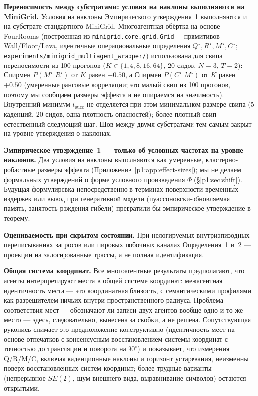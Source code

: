 \documentclass{article}
\begin{document}
\textbf{Переносимость между субстратами: условия на наклоны выполняются на MiniGrid.} Условия на наклоны Эмпирического утверждения~1 выполняются и на субстрате стандартного MiniGrid. Многоагентная обёртка на основе FourRooms (построенная из \texttt{minigrid.core.grid.Grid} + примитивов Wall/Floor/Lava, идентичные операциональные определения $Q^\star,R^\star,M^\star,C^\star$; \texttt{experiments/minigrid\_multiagent\_wrapper/}) использована для свипа переносимости из 100 прогонов ($K{\in}\{1,4,8,16,64\}$, 20 сидов, $N{=}3$, $T{=}2$): Спирмен $P(M^\star|R^\star)$ от $K$ равен $-0.50$, а Спирмен $P(C^\star|M^\star)$ от $K$ равен $+0.50$ (умеренные ранговые корреляции; это малый свип из 100 прогонов, поэтому мы сообщаем размеры эффекта и не опираемся на значимость). Внутренний минимум $t_{\mathrm{succ}}$ не отделяется при этом минимальном размере свипа (5 каденций, 20 сидов, одна плотность опасностей); более плотный свип --- естественный следующий шаг. Шов между двумя субстратами тем самым закрыт на уровне утверждения о наклонах.

\textbf{Эмпирическое утверждение~1 --- только об условных частотах на уровне наклонов.} Два условия на наклоны выполняются как умеренные, кластерно-робастные размеры эффекта (Приложение~\ref{p1:app:effect-sizes}); мы не делаем формальных утверждений о форме условного произведения $\Phi$ (\S\ref{p1:sec:shift}). Будущая формулировка непосредственно в терминах поверхности временн\'{ы}х издержек или вывод при генеративной модели (пуассоновски-обновляемая память, занятость рождения-гибели) превратили бы эмпирическое утверждение в теорему.

\textbf{Оцениваемость при скрытом состоянии.} При нелогируемых внутриэпизодных переписываниях запросов или пировых побочных каналах Определения~1 и~2 --- проекции на залогированные трассы, а не полная идентификация.

\textbf{Общая система координат.} Все многоагентные результаты предполагают, что агенты
интерпретируют места в общей системе координат: межагентная идентичность
места --- это координатная близость, с семантическими профилями как
разрешителем ничьих внутри пространственного радиуса. Проблема соответствия мест ---
обозначают ли записи двух агентов вообще одно и то же место ---
здесь, следовательно, вынесена за скобки, а не решена. Сопутствующая рукопись снимает
это предположение конструктивно (идентичность мест на основе отпечатков с
консенсусным восстановлением системы координат с точностью до трансляции и поворота на $90^\circ$)
и показывает, что измерения Q/R/M/C, включая каденционные наклоны и
горизонт устаревания, неизменны поверх восстановленных систем координат; более трудные
варианты (непрерывное $SE(2)$, шум внешнего вида, выравнивание
символов) остаются открытыми.
\end{document}
